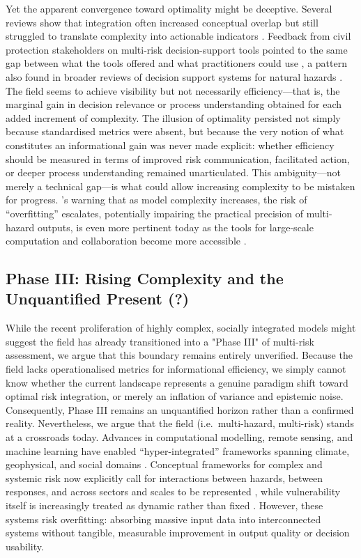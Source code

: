 \documentclass[12pt]{article}
\begin{document}
Yet the apparent convergence toward optimality might be deceptive. Several reviews show that integration often increased conceptual overlap but still struggled to translate complexity into actionable indicators \citep{Owolabi2023, laino2024scientometric, hochrainer2024managing, scolobig2017mainstreaming}. Feedback from civil protection stakeholders on multi-risk decision-support tools pointed to the same gap between what the tools offered and what practitioners could use \citep{komendantova2014multi}, a pattern also found in broader reviews of decision support systems for natural hazards \citep{newman2017review}. The field seems to achieve visibility but not necessarily efficiency---that is, the marginal gain in decision relevance or process understanding obtained for each added increment of complexity. The illusion of optimality persisted not simply because standardised metrics were absent, but because the very notion of what constitutes an informational gain was never made explicit: whether efficiency should be measured in terms of improved risk communication, facilitated action, or deeper process understanding remained unarticulated. This ambiguity---not merely a technical gap---is what could allow increasing complexity to be mistaken for progress. \citet{Dunant2021}'s warning that as model complexity increases, the risk of ``overfitting'' escalates, potentially impairing the practical precision of multi-hazard outputs, is even more pertinent today as the tools for large-scale computation and collaboration become more accessible \citep{mack2011fifty}.

\subsection{Phase III: Rising Complexity and the Unquantified Present (?)}
While the recent proliferation of highly complex, socially integrated models might suggest the field has already transitioned into a "Phase III" of multi-risk assessment, we argue that this boundary remains entirely unverified. Because the field lacks operationalised metrics for informational efficiency, we simply cannot know whether the current landscape represents a genuine paradigm shift toward optimal risk integration, or merely an inflation of variance and epistemic noise. Consequently, Phase III remains an unquantified horizon rather than a confirmed reality. Nevertheless, we argue that the field (i.e.\ multi-hazard, multi-risk) stands at a crossroads today. Advances in computational modelling, remote sensing, and machine learning have enabled ``hyper-integrated'' frameworks spanning climate, geophysical, and social domains \citep{Ferrario2025, MYRIAD2022, lundstrom2022moore}. Conceptual frameworks for complex and systemic risk now explicitly call for interactions between hazards, between responses, and across sectors and scales to be represented \citep{simpson2021framework, renn2022systemic, hochrainer2023toward, ward2022invited}, while vulnerability itself is increasingly treated as dynamic rather than fixed \citep{deruiter2022challenges}. However, these systems risk overfitting: absorbing massive input data into interconnected systems without tangible, measurable improvement in output quality or decision usability.
\end{document}
